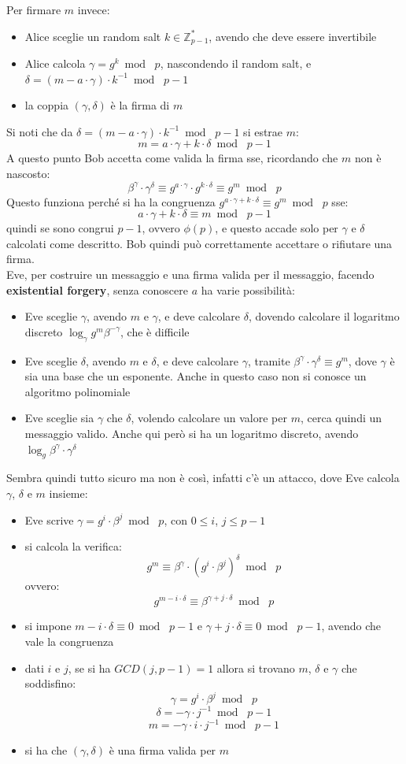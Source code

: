\documentclass[a4paper,12pt, oneside]{book}
\begin{document}
Per firmare $m$ invece:
\begin{itemize}
  \item Alice sceglie un random salt $k\in\mathbb{Z}_{p-1}^*$, avendo che deve
  essere invertibile
  \item Alice calcola $\gamma=g^k\bmod\,\,p$, nascondendo il random salt, e
  $\delta=(m-a\cdot \gamma)\cdot k^{-1}\bmod \,\,p-1$
  \item la coppia $(\gamma,\delta)$ è la firma di $m$
\end{itemize}
Si noti che da  $\delta=(m-a\cdot \gamma)\cdot k^{-1}\bmod \,\,p-1$ si estrae
$m$:
\[m=a\cdot \gamma+k\cdot \delta\bmod \,\,p-1\]
A questo punto Bob accetta come valida la firma sse, ricordando che $m$ non è
nascosto: 
\[\beta^\gamma\cdot \gamma^\delta\equiv g^{a\cdot \gamma}\cdot
  g^{k\cdot\delta}\equiv g^m\bmod\,\,p\]
Questo funziona perché si ha la congruenza $g^{a\cdot \gamma+k\cdot\delta}\equiv
g^m\bmod \,\,p$ sse: 
\[a\cdot \gamma+k\cdot \delta\equiv m\bmod\,\,p-1\]
quindi se sono congrui $p-1$, ovvero $\phi(p)$,
e questo accade solo per $\gamma$ e $\delta$ calcolati come descritto. Bob
quindi può correttamente accettare o rifiutare una firma.\\
Eve, per costruire un messaggio e una firma valida per il messaggio, facendo
\textbf{existential forgery}, senza conoscere $a$ ha varie possibilità:
\begin{itemize}
  \item Eve sceglie $\gamma$, avendo $m$ e $\gamma$, e deve calcolare $\delta$,
  dovendo calcolare il logaritmo discreto $\log_\gamma g^m\beta^{-\gamma}$, che
  è difficile
  \item Eve sceglie $\delta$, avendo $m$ e $\delta$, e deve calcolare $\gamma$,
  tramite $\beta^\gamma\cdot \gamma^\delta\equiv g^m$, dove $\gamma$ è sia una
  base che un esponente. Anche in questo caso non si conosce un algoritmo
  polinomiale
  \item Eve sceglie sia $\gamma$ che $\delta$, volendo calcolare un valore per
  $m$, cerca quindi un messaggio valido. Anche qui però si ha un logaritmo
  discreto, avendo $\log_g\beta^\gamma\cdot \gamma^\delta$
\end{itemize}
Sembra quindi tutto sicuro ma non è così, infatti c'è un attacco, dove Eve
calcola $\gamma$, $\delta$ e $m$ insieme: 
\begin{itemize}
  \item Eve scrive $\gamma=g^i\cdot \beta^j\bmod\,\,p$, con $0\leq i$, $j\leq
  p-1$ 
  \item si calcola la verifica:
  \[g^m\equiv \beta^\gamma\cdot (g^i\cdot \beta^j)^\delta\bmod\,\,p\]
  ovvero:
  \[g^{m-i\cdot\delta}\equiv \beta^{\gamma+j\cdot \delta}\bmod\,\,p\]
  \item si impone $m-i\cdot \delta\equiv 0\bmod\,\,p-1$ e $\gamma+j\cdot
  \delta\equiv 0\bmod\,\,p-1$, avendo che vale la congruenza
  \item dati $i$ e $j$, se si ha $GCD(j,p-1)=1$ allora si trovano $m$, $\delta$
  e $\gamma$ che soddisfino:
  \[\gamma=g^i\cdot \beta^j\bmod\,\,p\]
  \[\delta=-\gamma\cdot j^{-1}\bmod\,\,p-1\]
  \[m=-\gamma\cdot i\cdot j^{-1}\bmod\,\,p-1\]
  \item si ha che $(\gamma,\delta)$ è una firma valida per $m$
\end{itemize}
\end{document}
